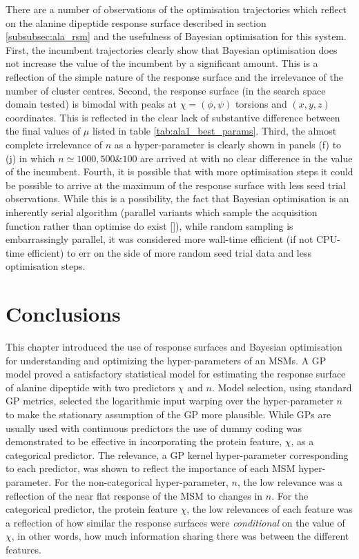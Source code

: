There are a number of observations of the optimisation trajectories which reflect on the alanine dipeptide response surface described in section \ref{subsubsec:ala_rsm} and the usefulness of Bayesian optimisation for this system. First, the incumbent trajectories clearly show that Bayesian optimisation does not increase the value of the incumbent by a significant amount. This is a reflection of the simple nature of the response surface and the irrelevance of the number of cluster centres. Second, the response surface (in the search space domain tested) is bimodal with peaks at $\chi=(\phi, \psi)$ torsions and $(x, y, z)$ coordinates. This is reflected in the clear lack of substantive difference between the final values of $\mu$ listed in table \ref{tab:ala1_best_params}.  Third, the almost complete irrelevance of $n$ as a hyper-parameter is clearly shown in panels (f) to (j) in which $n \simeq 1000, 500 \& 100$ are arrived at with no clear difference in the value of the incumbent. Fourth, it is possible that with more optimisation steps it could be possible to arrive at the maximum of the response surface with less seed trial observations. While this is a possibility, the fact that Bayesian optimisation is an inherently serial algorithm (parallel variants which sample the acquisition function rather than optimise do exist []), while random sampling is embarrassingly parallel, it was considered more wall-time efficient (if not CPU-time efficient) to err on the side of more random seed trial data and less optimisation steps. 



\section{Conclusions}\label{sec:msm_opt_conc}

This chapter introduced the use of response surfaces and Bayesian optimisation for understanding and optimizing the hyper-parameters of an MSMs. A GP model proved a satisfactory statistical model for estimating the response surface of alanine dipeptide with two predictors $\chi$ and $n$. Model selection, using standard GP metrics, selected the logarithmic input warping over the hyper-parameter $n$ to make the stationary assumption of the GP more plausible.  While GPs are usually used with continuous predictors the use of dummy coding  was demonstrated to be effective in incorporating the protein feature, $\chi$, as a categorical predictor. The relevance, a GP kernel hyper-parameter corresponding to each predictor,  was shown to reflect the importance of each  MSM hyper-parameter. For the non-categorical hyper-parameter, $n$, the low relevance was a reflection of the near flat response of the MSM to changes in $n$. For the categorical predictor, the protein feature $\chi$, the low relevances of each feature was a reflection of how similar the response surfaces were \emph{conditional} on the value of $\chi$, in other words, how much information sharing there was between the different features. 

